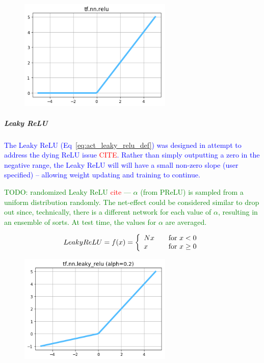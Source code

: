 \begin{figure}
	\centering
	\includegraphics[width=0.65\textwidth]{./sync_imgs/act/notsmooth/relu.png}
	\label{fig:act_notsmooth_relu}
\end{figure}

\subparagraph{Leaky ReLU}

\textcolor{blue}{The Leaky ReLU (Eq~\ref{eq:act_leaky_relu_def}) was designed in attempt to address the dying ReLU issue \textcolor{red}{CITE}. Rather than simply outputting a zero in the negative range, the Leaky ReLU will will have a small non-zero slope (user specified) -- allowing weight updating and training to continue.}

\textcolor{green}{TODO: randomized Leaky ReLU \textcolor{red}{cite} --- $\alpha$ (from PReLU) is sampled from a uniform distribution randomly. The net-effect could be considered similar to drop out since, technically, there is a different network for each value of $\alpha$, resulting in an ensemble of sorts. At test time, the values for $\alpha$ are averaged.}

\begin{equ}[!ht]
	\begin{equation}
	{
		Leaky ReLU = f(x) = \left\{
		\begin{array}{ll}
		N x & \quad $for$ \ x < 0 \\
		x & \quad $for$ \ x \ge 0
		\end{array}
		\right.
	}
	\label{eq:act_leaky_relu_def}
	\end{equation}
	\caption{where $N$ is a constant. $N$ is typically set to 0.01}
\end{equ}

\begin{figure}
	\centering
	\includegraphics[width=0.65\textwidth]{./sync_imgs/act/notsmooth/leakyrelu.png}
	\label{fig:act_notsmooth_leakyrelu}
\end{figure}

